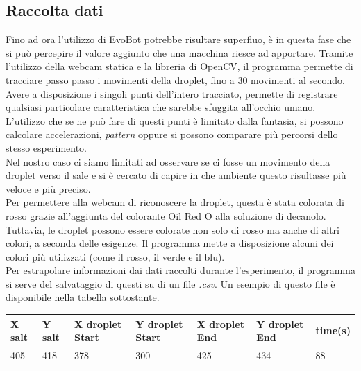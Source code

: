 \subsection{Raccolta dati}
Fino ad ora l'utilizzo di EvoBot potrebbe risultare superfluo, è in questa fase che si può percepire il valore aggiunto che una macchina riesce ad apportare. Tramite l'utilizzo della webcam statica e la libreria di OpenCV, il programma permette di tracciare passo passo i movimenti della droplet, fino a 30 movimenti al secondo. Avere a disposizione i singoli punti dell'intero tracciato, permette di registrare qualsiasi particolare caratteristica che sarebbe sfuggita all'occhio umano. L'utilizzo che se ne può fare di questi punti è limitato dalla fantasia, si possono calcolare accelerazioni, \emph{pattern} oppure si possono comparare più percorsi dello stesso esperimento.
\\Nel nostro caso ci siamo limitati ad osservare se ci fosse un movimento della droplet verso il sale e si è cercato di capire in che ambiente questo risultasse più veloce e più preciso.
\\Per permettere alla webcam di riconoscere la droplet, questa è stata colorata di rosso grazie all'aggiunta del colorante Oil Red O alla soluzione di decanolo. Tuttavia, le droplet possono essere colorate non solo di rosso ma anche di altri colori, a seconda delle esigenze. Il programma mette a disposizione alcuni dei colori più utilizzati (come il rosso, il verde e il blu). 
\\ Per estrapolare informazioni dai dati raccolti durante l'esperimento, il programma si serve del salvataggio di questi su di un file \emph{.csv}.
Un esempio di questo file è disponibile nella tabella sottostante. 

\begin{center}
\begin{tabular}{lllllll}
X salt & Y salt & X droplet Start & Y droplet Start & X droplet End & Y droplet End & time(s) \\
\hline
405    & 418    & 378             & 300             & 425           & 434           & 88  
\end{tabular}
\end{center}


